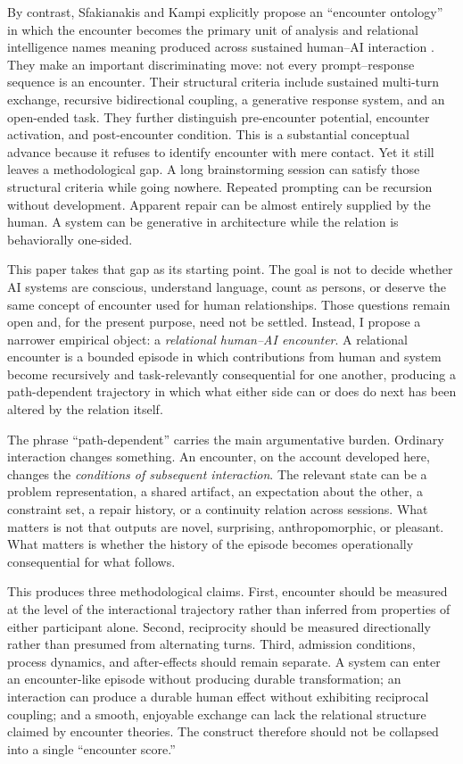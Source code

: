 \documentclass[11pt]{article}
\begin{document}
By contrast, Sfakianakis and Kampi explicitly propose an ``encounter ontology'' in which the encounter becomes the primary unit of analysis and relational intelligence names meaning produced across sustained human--AI interaction \citep{SfakianakisKampi2026Encounter}. They make an important discriminating move: not every prompt--response sequence is an encounter. Their structural criteria include sustained multi-turn exchange, recursive bidirectional coupling, a generative response system, and an open-ended task. They further distinguish pre-encounter potential, encounter activation, and post-encounter condition. This is a substantial conceptual advance because it refuses to identify encounter with mere contact. Yet it still leaves a methodological gap. A long brainstorming session can satisfy those structural criteria while going nowhere. Repeated prompting can be recursion without development. Apparent repair can be almost entirely supplied by the human. A system can be generative in architecture while the relation is behaviorally one-sided.

This paper takes that gap as its starting point. The goal is not to decide whether AI systems are conscious, understand language, count as persons, or deserve the same concept of encounter used for human relationships. Those questions remain open and, for the present purpose, need not be settled. Instead, I propose a narrower empirical object: a \emph{relational human--AI encounter}. A relational encounter is a bounded episode in which contributions from human and system become recursively and task-relevantly consequential for one another, producing a path-dependent trajectory in which what either side can or does do next has been altered by the relation itself.

The phrase ``path-dependent'' carries the main argumentative burden. Ordinary interaction changes something. An encounter, on the account developed here, changes the \emph{conditions of subsequent interaction}. The relevant state can be a problem representation, a shared artifact, an expectation about the other, a constraint set, a repair history, or a continuity relation across sessions. What matters is not that outputs are novel, surprising, anthropomorphic, or pleasant. What matters is whether the history of the episode becomes operationally consequential for what follows.

This produces three methodological claims. First, encounter should be measured at the level of the interactional trajectory rather than inferred from properties of either participant alone. Second, reciprocity should be measured directionally rather than presumed from alternating turns. Third, admission conditions, process dynamics, and after-effects should remain separate. A system can enter an encounter-like episode without producing durable transformation; an interaction can produce a durable human effect without exhibiting reciprocal coupling; and a smooth, enjoyable exchange can lack the relational structure claimed by encounter theories. The construct therefore should not be collapsed into a single ``encounter score.''
\end{document}
